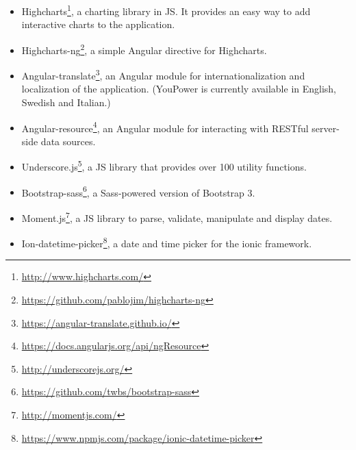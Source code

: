 \begin{itemize}

\item Highcharts\footnote{\url{http://www.highcharts.com/}}, a charting library in JS. It provides an easy way to add interactive charts to the application. 

\item Highcharts-ng\footnote{\url{https://github.com/pablojim/highcharts-ng}}, a simple Angular directive for Highcharts. 

\item Angular-translate\footnote{\url{https://angular-translate.github.io/}}, an Angular module for internationalization and localization of the application. (YouPower is currently available in English, Swedish and Italian.)

\item Angular-resource\footnote{\url{https://docs.angularjs.org/api/ngResource}}, an Angular module for interacting with RESTful server-side data sources. 

\item Underscore.js\footnote{\url{http://underscorejs.org/}}, a JS library that provides over 100 utility functions. 

\item Bootstrap-sass\footnote{\url{https://github.com/twbs/bootstrap-sass}}, a Sass-powered version of Bootstrap 3. 

\item Moment.js\footnote{\url{http://momentjs.com/}}, a JS library to parse, validate, manipulate and display dates. 

\item Ion-datetime-picker\footnote{\url{https://www.npmjs.com/package/ionic-datetime-picker}}, a date and time picker for the ionic framework. 

\end{itemize}